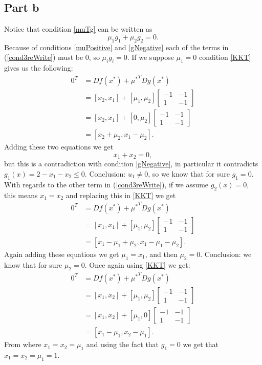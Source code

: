\documentclass{article}
\begin{document}
\subsection*{Part b}
Notice that condition \ref{muTg} can be written as
\begin{equation} \label{cond3reWrite}
\mu_1g_1 + \mu_2g_2=0.
\end{equation}
Because of conditions \ref{muPositive} and \ref{gNegative} each of the
terms in (\ref{cond3reWrite}) must be 0, so $\mu_ig_i=0$.
If we suppose $\mu_1=0$ condition \ref{KKT} gives us the following:
\begin{align*}
0^T&=Df(x^*)+{\mu^*}^TDg(x^*)\\
&=[x_2,x_1]+[\mu_1,\mu_2]\begin{bmatrix}
-1 & -1\\
1 & -1
\end{bmatrix}\\
&=[x_2,x_1]+[0,\mu_2]\begin{bmatrix}
-1 & -1\\
1 & -1
\end{bmatrix}\\
&=[ x_2+\mu_2, x_1-\mu_2].
\end{align*}
Adding these two equations we get
\[
x_1+x_2=0,
\]
but this is a contradiction with condition \ref{gNegative}, in particular it
contradicts $g_1(x)=2-x_1-x_2\leq0$. Conclusion: $u_1\neq 0$, so we know that
for sure $g_1=0$.
With regards to the other term in (\ref{cond3reWrite}), if we assume
$g_2(x)=0$, this means $x_1=x_2$ and replacing this in \ref{KKT} we
get
\begin{align*}
0^T&=Df(x^*)+{\mu^*}^TDg(x^*)\\
&=[x_1,x_1]+[\mu_1,\mu_2]\begin{bmatrix}
-1 & -1\\
1 & -1
\end{bmatrix}\\
&=[ x_1-\mu_1+\mu_2, x_1-\mu_1-\mu_2].
\end{align*}
Again adding these equations we get $\mu_1=x_1$, and then $\mu_2=0$.
Conclusion: we know that for sure $\mu_2=0$. Once again using
\ref{KKT} we get:
\begin{align*}
0^T&=Df(x^*)+{\mu^*}^TDg(x^*)\\
&=[x_1,x_2]+[\mu_1,\mu_2]\begin{bmatrix}
-1 & -1\\
1 & -1
\end{bmatrix}\\
&=[x_1,x_2]+[\mu_1,0]\begin{bmatrix}
-1 & -1\\
1 & -1
\end{bmatrix}\\
&=[ x_1-\mu_1, x_2-\mu_1].
\end{align*}
From where $x_1=x_2=\mu_1$ and using the fact that $g_1=0$ we get that
$x_1=x_2=\mu_1=1$.
\end{document}
